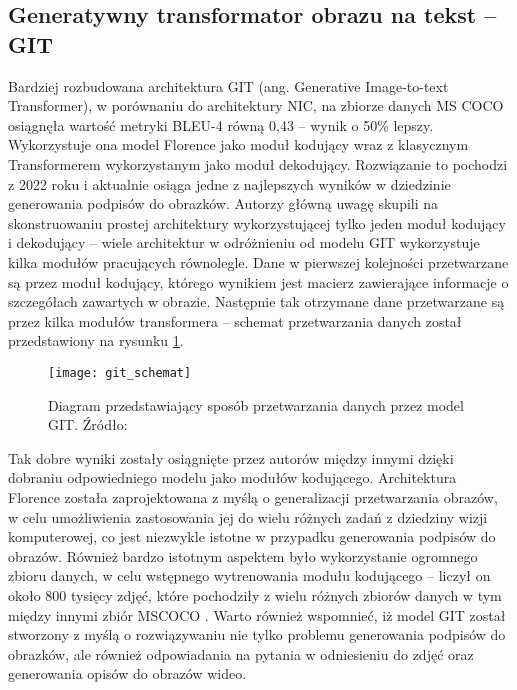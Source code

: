 \subsection{Generatywny transformator obrazu na tekst -- GIT}
Bardziej rozbudowana architektura GIT \cite{wang2022git} (ang. Generative Image-to-text Transformer), w porównaniu do architektury NIC, na zbiorze danych MS COCO osiągnęła wartość metryki BLEU-4 równą 0,43 -- wynik o 50\% lepszy. Wykorzystuje ona model Florence \cite{florence} jako moduł kodujący wraz z klasycznym Transformerem wykorzystanym jako moduł dekodujący. Rozwiązanie to pochodzi z 2022 roku i aktualnie osiąga jedne z najlepszych wyników w dziedzinie generowania podpisów do obrazków. Autorzy główną uwagę skupili na skonstruowaniu prostej architektury wykorzystującej tylko jeden moduł kodujący i dekodujący -- wiele architektur w odróżnieniu od modelu GIT wykorzystuje kilka modułów pracujących równolegle. Dane w pierwszej kolejności przetwarzane są przez moduł kodujący, którego wynikiem jest macierz zawierające informacje o szczegółach zawartych w obrazie. Następnie tak otrzymane dane przetwarzane są przez kilka modułów transformera -- schemat przetwarzania danych został przedstawiony na rysunku \ref{fig:git-architecture}.
\begin{figure}[H]
  \centering
  \texttt{[image: git\_schemat]}
  \caption{Diagram przedstawiający sposób przetwarzania danych przez model GIT. Źródło:~\cite{wang2022git}}
  \label{fig:git-architecture}
\end{figure}
\noindent Tak dobre wyniki zostały osiągnięte przez autorów między innymi dzięki dobraniu odpowiedniego modelu jako modułów kodującego. Architektura Florence została zaprojektowana z myślą o generalizacji przetwarzania obrazów, w celu umożliwienia zastosowania jej do wielu różnych zadań z dziedziny wizji komputerowej, co jest niezwykle istotne w przypadku generowania podpisów do obrazów. Również bardzo istotnym aspektem było wykorzystanie ogromnego zbioru danych, w celu wstępnego wytrenowania modułu kodującego -- liczył on około 800 tysięcy zdjęć, które pochodziły z wielu różnych zbiorów danych  \cite{sharma2018conceptual} \cite{ordonez2011im2text} \cite{krishna2017visual} \cite{changpinyo2021conceptual} \cite{hu2022scaling} w tym między innymi zbiór MSCOCO \cite{mscoco}. Warto również wspomnieć, iż model GIT został stworzony z myślą o rozwiązywaniu nie tylko problemu generowania podpisów do obrazków, ale również odpowiadania na pytania w odniesieniu do zdjęć oraz generowania opisów do obrazów wideo.

